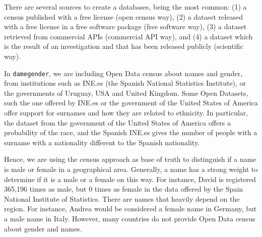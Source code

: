 \documentclass[a4paper]{article}
\begin{document}
There are several sources to create a databases, being the most common:  
(1) a census published with a free license (open census way), 
(2) a dataset released with a free license in a free software package (free software way), 
(3) a dataset retrieved from commercial APIs (commercial API way), and
(4) a dataset which is the result of an investigation and that has been released publicly (scientific way).

In \texttt{damegender}, we are including Open Data census about names and gender, from institutions such as INE.es (the Spanish National Statistics Institute), or the governments of Uruguay, USA and United Kingdom.
Some Open Datasets, such the one offered by INE.es or the government of the United States of America offer support for surnames and how they are related to ethnicity. 
In particular, the dataset from the government of the United States of America offers a probability of the race, and the Spanish INE.es gives the number of people with a surname with a nationality different to the Spanish nationality.

Hence, we are using the census approach as base of truth to distinguish if a name is male or female in a geographical area. 
Generally, a name has a strong weight to determine if it is a male or a female on this way.
For instance, David is registered 365,196 times as male, but 0 times as female in the data offered by the Spain National Institute of Statistics.
There are names that heavily depend on the region. 
For instance, Andrea would be considered a female name in Germany, but a male name in Italy.
However, many countries do not provide Open Data census about gender and names.



\end{document}
